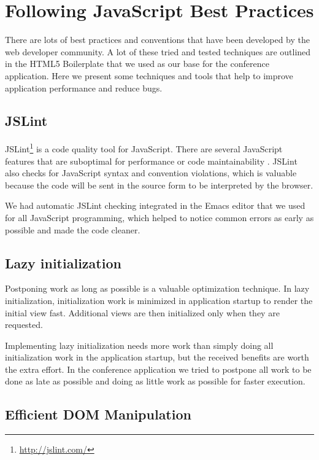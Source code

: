 \section{Following JavaScript Best Practices}
\label{section:js-best-practices}

There are lots of best practices and conventions that have been
developed by the web developer community. A lot of these tried and
tested techniques are outlined in the HTML5 Boilerplate
\citationneeded that we used as our base for the conference
application. Here we present some techniques and tools that help to
improve application performance and reduce bugs.

\subsection{JSLint}

JSLint\footnote{\url{http://jslint.com/}} is a code quality tool for
JavaScript. There are several JavaScript features that are suboptimal
for performance or code maintainability
\cite{crockford2008javascript}. JSLint also checks for JavaScript
syntax and convention violations, which is valuable because the code
will be sent in the source form to be interpreted by the browser.

We had automatic JSLint checking integrated in the Emacs
\citationneeded editor that we used for all JavaScript programming,
which helped to notice common errors as early as possible and made the
code cleaner.

\subsection{Lazy initialization}

Postponing work as long as possible is a valuable optimization
technique. In lazy initialization, initialization work is minimized in
application startup to render the initial view fast. Additional views
are then initialized only when they are requested.

Implementing lazy initialization needs more work than simply doing all
initialization work in the application startup, but the received
benefits are worth the extra effort. In the conference application we
tried to postpone all work to be done as late as possible and doing as
little work as possible for faster execution.

\subsection{Efficient DOM Manipulation}

